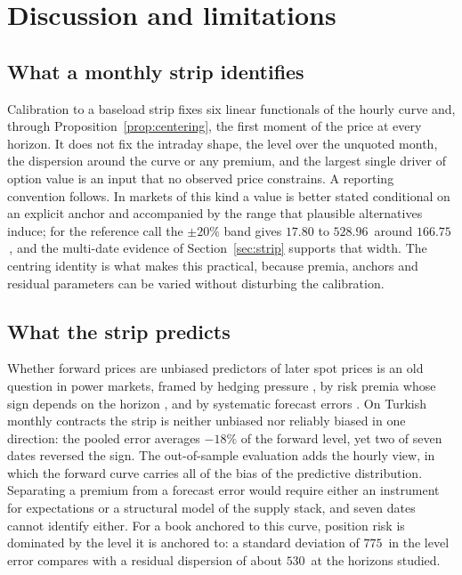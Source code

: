 \section{Discussion and limitations}
\label{sec:discussion}

\subsection{What a monthly strip identifies}

Calibration to a baseload strip fixes six linear functionals of the hourly
curve and, through Proposition~\ref{prop:centering}, the first moment of the
price at every horizon. It does not fix the intraday shape, the level over the
unquoted month, the dispersion around the curve or any premium, and the
largest single driver of option value is an input that no observed price
constrains. A reporting convention follows. In markets of this kind a value is
better stated conditional on an explicit anchor and accompanied by the range
that plausible alternatives induce; for the reference call the $\pm20\%$ band
gives $17.80$ to $528.96$\,\TRY{} around $166.75$\,\TRY, and the multi-date
evidence of Section~\ref{sec:strip} supports that width. The centring identity
is what makes this practical, because premia, anchors and residual parameters
can be varied without disturbing the calibration.

\subsection{What the strip predicts}

Whether forward prices are unbiased predictors of later spot prices is an old
question in power markets, framed by hedging pressure
\citep{BessembinderLemmon2002}, by risk premia whose sign depends on the
horizon \citep{BenthCarteaKiesel2008}, and by systematic forecast errors
\citep{Redl2009}. On Turkish monthly contracts the strip is neither unbiased
nor reliably biased in one direction: the pooled error averages $-18\%$ of the
forward level, yet two of seven dates reversed the sign. The out-of-sample
evaluation adds the hourly view, in which the forward curve carries all of the
bias of the predictive distribution. Separating a premium from a forecast error
would require either an instrument for expectations or a structural model of
the supply stack, and seven dates cannot identify either. For a book anchored
to this curve, position risk is dominated by the level it is anchored to: a
standard deviation of $775$\,\TRY{} in the level error compares with a
residual dispersion of about $530$\,\TRY{} at the horizons studied.

